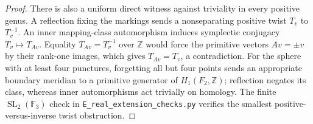 \begin{proof}
There is also a uniform direct witness against triviality
in every positive genus.  A reflection fixing the markings
sends a nonseparating positive twist $T_v$ to $T_v^{-1}$.
An inner mapping-class automorphism induces symplectic
conjugacy $T_v\mapsto T_{Av}$.  Equality
$T_{Av}=T_v^{-1}$ over $\mathbb Z$ would force the primitive
vectors $Av=\pm v$ by their rank-one images, which gives
$T_{Av}=T_v$, a contradiction.  For the sphere with at
least four punctures, forgetting all but four points sends
an appropriate boundary meridian to a primitive generator
of $H_1(F_2,\mathbb Z)$; reflection negates its class,
whereas inner automorphisms act trivially on homology.
The finite $\operatorname{SL}_2(\mathbb F_3)$ check in
\texttt{E\_real\_extension\_checks.py} verifies the smallest
positive-versus-inverse twist obstruction.
\end{proof}

